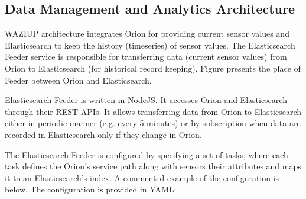 \subsection{Data Management and Analytics Architecture}
WAZIUP architecture integrates Orion for providing current sensor values and Elasticsearch to keep the history (timeseries) of sensor values. The Elasticsearch Feeder service is responsible for transferring data (current sensor values) from Orion to Elasticsearch (for historical record keeping). Figure \label{fig-services} presents the place of Feeder between Orion and Elasticsearch.

Elasticsearch Feeder is written in NodeJS. It accesses Orion and Elasticsearch through their REST APIs. It allows transferring data from Orion to Elasticsearch either in periodic manner (e.g. every 5 minutes) or by subscription when data are recorded in Elasticsearch only if they change in Orion.

The Elasticsearch Feeder is configured by specifying a set of tasks, where each task defines the Orion’s service path along with sensors their attributes and maps it to an Elasticsearch’s index.  A commented example of the configuration is below. The configuration is provided in YAML:

